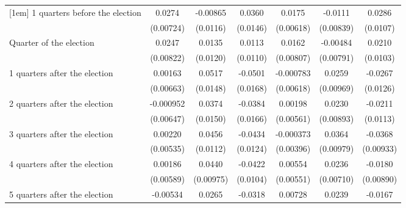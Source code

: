 \begin{table}[htbp]
\begin{tabular}{l*{6}{c}}
[1em]
 1 quarters before the election&      0.0274\sym{***}&    -0.00865         &      0.0360\sym{*}  &      0.0175\sym{**} &     -0.0111         &      0.0286\sym{**} \\
                    &   (0.00724)         &    (0.0116)         &    (0.0146)         &   (0.00618)         &   (0.00839)         &    (0.0107)         \\
[1em]
Quarter of the election&      0.0247\sym{**} &      0.0135         &      0.0113         &      0.0162\sym{*}  &    -0.00484         &      0.0210\sym{*}  \\
                    &   (0.00822)         &    (0.0120)         &    (0.0110)         &   (0.00807)         &   (0.00791)         &    (0.0103)         \\
[1em]
 1 quarters after the election&     0.00163         &      0.0517\sym{***}&     -0.0501\sym{**} &   -0.000783         &      0.0259\sym{**} &     -0.0267\sym{*}  \\
                    &   (0.00663)         &    (0.0148)         &    (0.0168)         &   (0.00618)         &   (0.00969)         &    (0.0126)         \\
[1em]
 2 quarters after the election&   -0.000952         &      0.0374\sym{*}  &     -0.0384\sym{*}  &     0.00198         &      0.0230\sym{**} &     -0.0211         \\
                    &   (0.00647)         &    (0.0150)         &    (0.0166)         &   (0.00561)         &   (0.00893)         &    (0.0113)         \\
[1em]
 3 quarters after the election&     0.00220         &      0.0456\sym{***}&     -0.0434\sym{***}&   -0.000373         &      0.0364\sym{***}&     -0.0368\sym{***}\\
                    &   (0.00535)         &    (0.0112)         &    (0.0124)         &   (0.00396)         &   (0.00979)         &   (0.00933)         \\
[1em]
 4 quarters after the election&     0.00186         &      0.0440\sym{***}&     -0.0422\sym{***}&     0.00554         &      0.0236\sym{***}&     -0.0180\sym{*}  \\
                    &   (0.00589)         &   (0.00975)         &    (0.0104)         &   (0.00551)         &   (0.00710)         &   (0.00890)         \\
[1em]
 5 quarters after the election&    -0.00534         &      0.0265\sym{*}  &     -0.0318\sym{**} &     0.00728         &      0.0239\sym{**} &     -0.0167         \\

\end{tabular}
\end{table}
